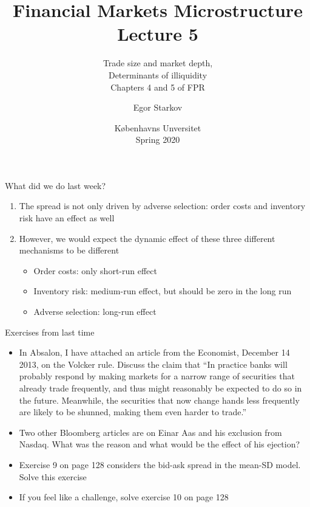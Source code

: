 \documentclass[english,10pt]{beamer}
\title{Financial Markets Microstructure \\ Lecture 5}
\subtitle{Trade size and market depth, \\ Determinants of illiquidity\\
	Chapters 4 and 5 of FPR}
\author{Egor Starkov}
\date{K{\o}benhavns Unversitet \\
	Spring 2020}
\begin{document}
	

\frame[plain]{\titlepage}


\begin{frame}{What did we do last week?}
	\begin{enumerate}
		\item The spread is not only driven by adverse selection: order costs and inventory risk have an effect as well
		\item However, we would expect the dynamic effect of these three different mechanisms to be different
		\begin{itemize}
			\item Order costs: only short-run effect 
			\item Inventory risk: medium-run effect, but should be zero in the long run
			\item Adverse selection: long-run effect 
		\end{itemize}
	\end{enumerate}
\end{frame}


\begin{frame}{Exercises from last time}
	\begin{itemize}
		\item In Absalon, I have attached an article from the Economist, December 14 2013, on the Volcker rule. Discuss the claim that ``In practice banks will probably respond by making markets for a narrow range of securities that already trade frequently, and thus might reasonably be expected to do so in the future. Meanwhile, the securities that now change hands less frequently are likely to be shunned, making them even harder to trade.''
		\item Two other Bloomberg articles are on Einar Aas and his exclusion from Nasdaq. What was the reason and what would be the effect of his ejection?
		\item {\color{gray} Exercise 9 on page 128 considers the bid-ask spread in the mean-SD model. Solve this exercise}
		\item {\color{gray} If you feel like a challenge, solve exercise 10 on page 128}
	\end{itemize}
\end{frame}
\end{document}
